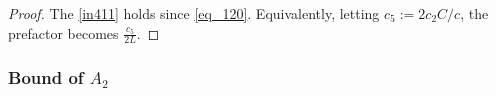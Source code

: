 \documentclass[twoside,11pt]{article}
\begin{document}
\begin{proof}

The \eqref{in411} holds since \eqref{eq_120}. 
Equivalently, letting $c_5 := 2c_2C/c$, the prefactor becomes $\frac{c_5}{2L}$.
\end{proof}




\subsubsection{Bound of $A_2$}
\end{document}
